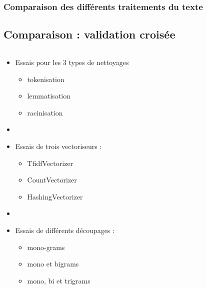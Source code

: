 \documentclass[8pt,aspectratio=169,hyperref={unicode=true}]{beamer}
\begin{document}
\subsubsection{Comparaison des différents traitements du texte}
\begin{frame}{\insertsubsection}{\insertsubsubsection}
    \begin{table}
        \scriptsize
        
    \end{table}
\end{frame}

\subsection{Comparaison : validation croisée}
\begin{frame}{\insertsubsection}
    \begin{columns}
        \begin{column}{.45\textwidth}
            \begin{itemize}
                \item Essais pour les 3 types de nettoyages
                      \begin{itemize}
                          \item tokenisation
                          \item lemmatisation
                          \item racinisation
                      \end{itemize}
                \item[]
                \item Essais de trois vectoriseurs :
                      \begin{itemize}
                          \item TfidfVectorizer
                          \item CountVectorizer
                          \item HashingVectorizer
                      \end{itemize}
                \item[]
                \item Essais de différents découpages :
                      \begin{itemize}
                          \item mono-grams
                          \item mono et bigrams
                          \item mono, bi et trigrams

\end{itemize}
\end{itemize}
\end{column}
\end{columns}
\end{frame}
\end{document}
